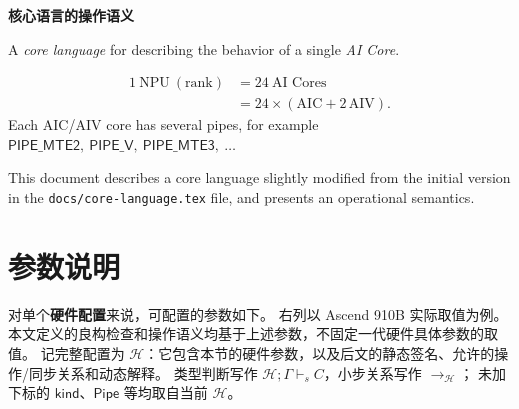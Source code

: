\documentclass[UTF8,a4paper,11pt,fontset=fandol]{ctexart}
\begin{document}
\begin{center}
\Large\bfseries 核心语言的操作语义
\end{center}


\noindent

A \emph{core language} for describing the behavior of a single \emph{AI Core}.

\[
\begin{aligned}
1\ \mathrm{NPU}\ (\mathrm{rank})
  &= 24\ \text{AI Cores}\\
  &= 24\times(\mathrm{AIC}+2\,\mathrm{AIV}).
\end{aligned}
\]
Each AIC/AIV core has several pipes, for example
$
\mathsf{PIPE\_MTE2},\ \mathsf{PIPE\_V},\ \mathsf{PIPE\_MTE3},\ \ldots
$

This document describes a core language slightly modified from the initial
version in the \texttt{docs/core-language.tex} file, and presents an operational semantics.

\section{参数说明}

对单个\textbf{硬件配置}来说，可配置的参数如下。
右列以 Ascend 910B 实际取值为例。
本文定义的良构检查和操作语义均基于上述参数，不固定一代硬件具体参数的取值。
记完整配置为 $\mathcal H$：它包含本节的硬件参数，以及后文的静态签名、允许的操作/同步关系和动态解释。
类型判断写作 $\mathcal H;\Gamma\vdash_s C$，小步关系写作 $\longrightarrow_{\mathcal H}$；
未加下标的 $\mathsf{kind}$、$\mathsf{Pipe}$ 等均取自当前 $\mathcal H$。
\end{document}
